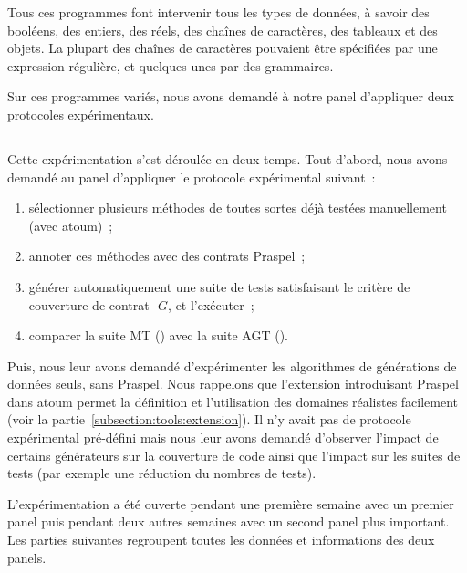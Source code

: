 Tous ces programmes font intervenir tous les types de données, à savoir des
booléens, des entiers, des réels, des chaînes de caractères, des tableaux et des
objets. La plupart des chaînes de caractères pouvaient être spécifiées par une
expression régulière, et quelques-unes par des grammaires.

Sur ces programmes variés, nous avons demandé à notre panel d'appliquer deux
protocoles expérimentaux.

\subsection{}
\label{subsection:experimentation:modus_operandi}

Cette expérimentation s'est déroulée en deux temps. Tout d'abord, nous avons
demandé au panel d'appliquer le protocole expérimental suivant~:
%
\begin{enumerate}

\item sélectionner plusieurs méthodes de toutes sortes déjà testées
manuellement (avec atoum)~;

\item annoter ces méthodes avec des contrats Praspel~;

\item générer automatiquement une suite de tests satisfaisant le critère de
couverture de contrat -$G$, et l'exécuter~;

\item comparer la suite MT () avec la suite AGT
().

\end{enumerate}

Puis, nous leur avons demandé d'expérimenter les algorithmes de générations de
données seuls, sans Praspel. Nous rappelons que l'extension introduisant Praspel
dans atoum permet la définition et l'utilisation des domaines réalistes
facilement (voir la partie~\ref{subsection:tools:extension}). Il n'y avait pas
de protocole expérimental pré-défini mais nous leur avons demandé d'observer
l'impact de certains générateurs sur la couverture de code ainsi que l'impact
sur les suites de tests (par exemple une réduction du nombres de tests).

L'expérimentation a été ouverte pendant une première semaine avec un premier
panel puis pendant deux autres semaines avec un second panel plus important. Les
parties suivantes regroupent toutes les données et informations des deux panels.

